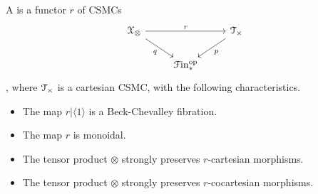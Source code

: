 \documentclass[main.tex]{subfiles}
\begin{document}
\begin{definition}
  A  is a functor $r$ of CSMCs
  \begin{equation*}
    \begin{tikzcd}
      \category{X}_{\otimes}
      \arrow[rr, "r"]
      \arrow[dr, swap, "q"]
      && \category{T}_{\times}
      \arrow[dl, "p"]
      \\
      & \Finp\op
    \end{tikzcd}
  \end{equation*},
  where $\mathcal{T}_{\times}$ is a cartesian CSMC, with the following characteristics.
  \begin{itemize}
    \item The map $r|\langle 1 \rangle$ is a Beck-Chevalley fibration.

    \item The map $r$ is monoidal.

    \item The tensor product $\otimes$ strongly preserves $r$-cartesian morphisms.

    \item The tensor product $\otimes$ strongly preserves $r$-cocartesian morphisms.







\end{itemize}
\end{definition}
\end{document}
